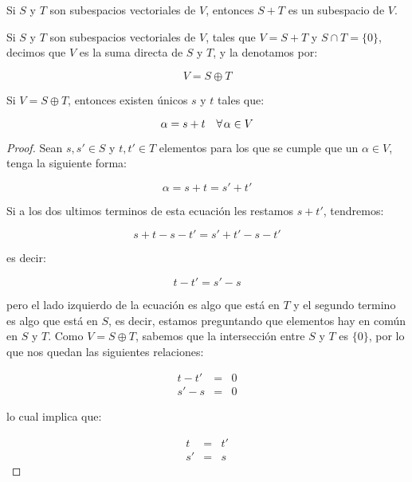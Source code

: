 		\begin{proposicion}
			Si $S$ y $T$ son subespacios vectoriales de $V$, entonces $S + T$ es un subespacio de $V$.
		\end{proposicion}

		\begin{definicion}
			Si $S$ y $T$ son subespacios vectoriales de $V$, tales que $V = S + T$ y $S \cap T = \{0\}$, decimos que $V$ es la suma directa de $S$ y $T$, y la denotamos por:

			\begin{equation}
				V = S \oplus T 
			\end{equation}
		\end{definicion}

		\begin{proposicion}
			Si $V = S \oplus T$, entonces existen únicos $s$ y $t$ tales que:

			\begin{equation}
				\alpha = s + t \quad \forall \mkern2mu \alpha \in V
			\end{equation}
		\end{proposicion}

		\begin{proof}
			Sean $s, s' \in S$ y $t, t' \in T$ elementos para los que se cumple que un $\alpha \in V$, tenga la siguiente forma:

			\begin{equation*}
				\alpha = s + t = s' + t'
			\end{equation*}

			Si a los dos ultimos terminos de esta ecuación les restamos $s + t'$, tendremos:

			\begin{equation*}
				s + t - s - t' = s' + t' - s - t'
			\end{equation*}

			es decir:

			\begin{equation*}
				t - t' = s' - s
			\end{equation*}

			pero el lado izquierdo de la ecuación es algo que está en $T$ y el segundo termino es algo que está en $S$, es decir, estamos preguntando que elementos hay en común en $S$ y $T$.
			Como $V = S \oplus T$, sabemos que la intersección entre $S$ y $T$ es $\{0\}$, por lo que nos quedan las siguientes relaciones:

			\begin{eqnarray*}
				t - t' & = & 0 \\
				s' - s & = & 0
			\end{eqnarray*}

			lo cual implica que:

			\begin{eqnarray*}
				t & = & t' \\
				s' & = & s
			\end{eqnarray*}
		\end{proof}

